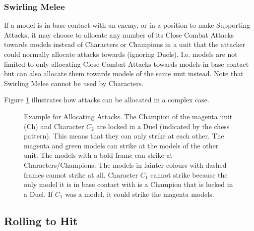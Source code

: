 \newpage
\subsubsection{Swirling Melee}
\label{swirling_melee}

If a \rnf{} model is in base contact with an enemy, or in a position to make Supporting Attacks, it may  choose to allocate any number of its Close Combat Attacks towards \rnf{} models instead of Characters or Champions in a unit that the attacker could normally allocate attacks towards (ignoring Duels). I.e. \rnf{} models are not limited to only allocating Close Combat Attacks towards models in base contact but can also allocate them towards \rnf{} models of the same unit instead. Note that Swirling Melee cannot be used by Characters.

Figure \ref{figure/allocate_attacks} illustrates how attacks can be allocated in a complex case.

\newcommand{\figAHCharOne}{$C_{1} $}
\newcommand{\figAHCharTwo}{$C_{2} $}
\newcommand{\figAHCharThree}{$C_{3} $}
\newcommand{\figAHChamp}{Ch}

\begin{figure}[!htbp]
\begin{minipage}{0.48\textwidth}
\def\svgwidth{\textwidth}

\end{minipage}\hfill\begin{minipage}{0.51\textwidth}
\caption{Example for Allocating Attacks.\vspace*{10pt}\newline
The Champion of the magenta unit (Ch) and Character $C_{2} $ are locked in a Duel (indicated by the chess pattern). This means that they can only strike at each other. The magenta and green models can strike at the \rnf{} models of the other unit. The models with a bold frame can strike at Characters/Champions. The models in fainter colours with dashed frames cannot strike at all. Character $C_{1} $ cannot strike because the only model it is in base contact with is a Champion that is locked in a Duel. If $C_{1} $ was a \rnf{} model, it could strike the magenta \rnf{} models.}
\label{figure/allocate_attacks}
\end{minipage}
\end{figure}


\subsection{Rolling to Hit}
\label{rolling_to_hit}

